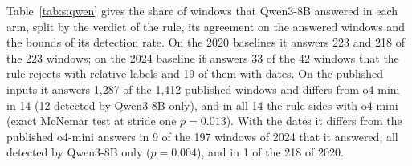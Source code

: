 Table~\ref{tab:s:qwen} gives the share of windows that Qwen3-8B answered in each arm, split by the verdict of the rule, its agreement on the answered windows and the bounds of its detection rate. On the 2020 baselines it answers 223 and 218 of the 223 windows; on the 2024 baseline it answers 33 of the 42 windows that the rule rejects with relative labels and 19 of them with dates. On the published inputs it answers 1{,}287 of the 1{,}412 published windows and differs from o4-mini in 14 (12 detected by Qwen3-8B only), and in all 14 the rule sides with o4-mini (exact McNemar test at stride one $p=0.013$). With the dates it differs from the published o4-mini answers in 9 of the 197 windows of 2024 that it answered, all detected by Qwen3-8B only ($p=0.004$), and in 1 of the 218 of 2020.

